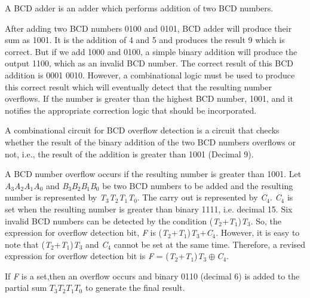 \begin{property}\textnormal{
		A BCD adder is an adder which performs addition of two BCD numbers.}
\end{property}

\begin{example}\textnormal{
		After adding two BCD numbers 0100 and 0101, BCD adder will produce their sum as 1001. It is the addition of 4 and 5 and produces the result 9 which is correct. But if we add 1000 and 0100, a simple binary addition will produce the output 1100, which as an invalid BCD number. The correct result of this BCD addition is 0001 0010. However, a combinational logic must be used to produce this correct result which will eventually detect that the resulting number overflows. If the number is greater than the highest BCD number, 1001, and  it notifies the appropriate correction logic that should be incorporated.}
\end{example}

\begin{property}\textnormal{
		A combinational circuit for BCD overflow detection is a circuit that checks whether the result of the binary addition of the two BCD numbers overflows or not, i.e., the result of the addition is greater than 1001 (Decimal 9).}
\end{property}

A BCD number overflow occurs if the resulting number is greater than 1001. Let {\it A}${}_{3}${\it A}${}_{2}${\it A}${}_{1}${\it A}${}_{0}$ and {\it B}${}_{3}${\it B}${}_{2}${\it B}${}_{1}${\it B}${}_{0}$ be two BCD numbers to be added and the resulting number is represented by {\it T}${}_{3}${\it T}${}_{2}${\it T}${}_{1}${\it T}${}_{0}$. The carry out is represented by {\it C}${}_{4}$. {\it C}${}_{4}$ is set when the resulting number is greater than binary 1111, i.e. decimal 15. Six invalid BCD numbers can be detected by the condition ({\it T}${}_{2}$+{\it T}${}_{1}$){\it T}${}_{3}$. So, the expression for overflow detection bit, {\it F }is ({\it T}${}_{2}$+{\it T}${}_{1}$){\it T}${}_{3}$+{\it C}${}_{4}$. However, it is easy to note that ({\it T}${}_{2}$+{\it T}${}_{1}$){\it T}${}_{3}$ and {\it C}${}_{4}$ cannot be set at the same time. Therefore, a revised expression for overflow detection bit is {\it F }= ({\it T}${}_{2}$+{\it T}${}_{1}$){\it T}${}_{3}\oplus${\it C}${}_{4}$.

If {\it F} is a set,then an overflow occurs and binary 0110 (decimal 6) is added to the partial sum $T{}_{3}T{}_{2}T{}_{1}T{}_{0}$ to generate the final result.

